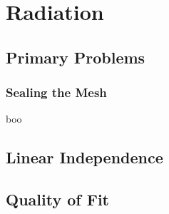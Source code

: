 % 

\section{Radiation}

\subsection{Primary Problems}
\begin{frame}\frametitle{Sealing the Mesh}
boo
\end{frame}


\subsection{Linear Independence}
	
\subsection{Quality of Fit}

\endinput  %
